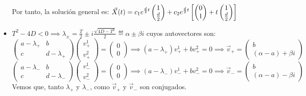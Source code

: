 \begin{itemize}
\begin{ejem}[$y'' - dy - cy = 0$]
		      Por tanto, la solución general es: $\displaystyle \vec{X}(t) = c_1 e^{\frac{d}{2}t} \begin{pmatrix}
				      1 \\
				      \frac{d}{2}
			      \end{pmatrix} + c_2 e^{\frac{d}{2}t} \left[\begin{pmatrix}
					      0 \\
					      1
				      \end{pmatrix} + t \begin{pmatrix}
					      1 \\
					      \frac{d}{2}
				      \end{pmatrix}\right]$
	      \end{ejem}
	\item {} $T^2 - 4D < 0 \implies \lambda_{\pm} = \frac{T}{2} \pm i\frac{\sqrt{4D - T^2}}{2} \eqdef \alpha \pm \beta i$ cuyos autovectores son:
	      \[\begin{pmatrix}
			      a-\lambda_+ & b           \\
			      c           & d-\lambda_+
		      \end{pmatrix} \begin{pmatrix}
			      v_+^1 \\
			      v_+^2
		      \end{pmatrix} = \begin{pmatrix}
			      0 \\
			      0
		      \end{pmatrix} \implies (a - \lambda_+)v_+^1 + bv_+^2 = 0 \implies \vec{v}_+ = \begin{pmatrix}
			      b \\
			      (\alpha-a) + \beta i
		      \end{pmatrix}\]
	      \[\begin{pmatrix}
			      a-\lambda_- & b           \\
			      c           & d-\lambda_-
		      \end{pmatrix} \begin{pmatrix}
			      v_-^1 \\
			      v_-^2
		      \end{pmatrix} = \begin{pmatrix}
			      0 \\
			      0
		      \end{pmatrix} \implies (a - \lambda_-)v_-^1 + bv_-^2 = 0 \implies \vec{v}_- = \begin{pmatrix}
			      b \\
			      (\alpha-a) - \beta i
		      \end{pmatrix}\]
	      Vemos que, tanto $\lambda_+$ y $\lambda_-$, como $\vec{v}_+$ y $\vec{v}_-$ son conjugados.


\end{itemize}
